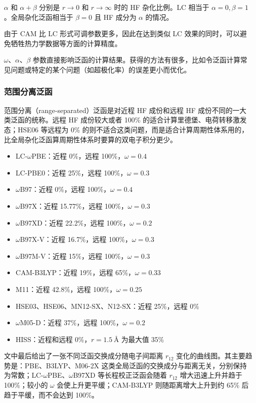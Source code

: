 $\alpha$ 和 $\alpha+\beta$ 分别是 $r\to 0$ 和 $r\to \infty$ 时的 HF 杂化比例。LC 相当于 $\alpha=0,\beta=1$。全局杂化泛函相当于 $\beta=0$ 且 HF 成分为 $\alpha$ 的情况。

由于 CAM 比 LC 形式可调参数更多，因此在达到类似 LC 效果的同时，可以避免牺牲热力学数据等方面的计算精度。

$\omega$、$\alpha$、$\beta$ 参数直接影响泛函的计算结果。获得的方法有很多，比如令泛函计算常见问题或特定的某个问题（如超极化率）的误差更小而优化。

\subsubsection*{范围分离泛函}

范围分离（range-separated）泛函是对近程 HF 成份和远程 HF 成份不同的一大类泛函的统称。远程 HF 成份较大或者 100\% 的适合计算里德堡、电荷转移激发态；HSE06 等远程为 0\% 的则不适合这类问题，而是适合计算周期性体系用的，比全局杂化泛函算周期性体系时要算的双电子积分更少。

\begin{itemize}
  \item LC-$\omega$PBE：近程 0\%，远程 100\%，$\omega=0.4$
  \item LC-PBE0：近程 25\%，远程 100\%，$\omega=0.3$
  \item $\omega$B97：近程 0\%，远程 100\%，$\omega=0.4$
  \item $\omega$B97X：近程 15.77\%，远程 100\%，$\omega=0.3$
  \item $\omega$B97XD：近程 22.2\%，远程 100\%，$\omega=0.2$
  \item $\omega$B97X-V：近程 16.7\%，远程 100\%，$\omega=0.3$
  \item $\omega$B97M-V：近程 15\%，远程 100\%，$\omega=0.3$
  \item CAM-B3LYP：近程 19\%，远程 65\%，$\omega=0.33$
  \item M11：近程 42.8\%，远程 100\%，$\omega=0.25$
  \item HSE03、HSE06、MN12-SX、N12-SX：近程 25\%，远程 0\%
  \item $\omega$M05-D：近程 37\%，远程 100\%，$\omega=0.2$
  \item HISS：近程和远程 0\%，$r=1.5\ \text{\AA}$ 为最大值 35\%
\end{itemize}

文中最后给出了一张不同泛函交换成分随电子间距离 $r_{12}$ 变化的曲线图。其主要趋势是：PBE、B3LYP、M06-2X 这类全局泛函的交换成分与距离无关，分别保持为常数；LC-$\omega$PBE、$\omega$B97XD 等长程校正泛函会随着 $r_{12}$ 增大迅速上升并趋于 100\%；较小的 $\omega$ 会使上升更平缓；CAM-B3LYP 则随距离增大上升到约 65\% 后趋于平缓，而不会达到 100\%。

